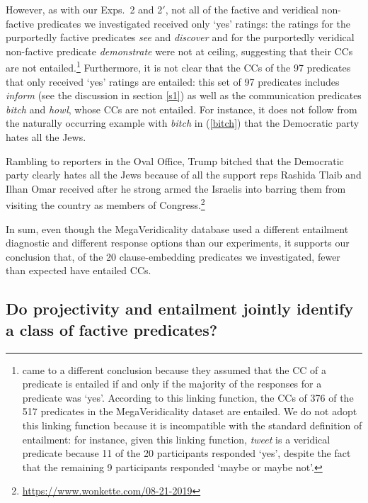 \documentclass[11pt,fleqn]{article}
\newcommand{\6}{\mbox{$[\hspace*{-.6mm}[$}}
\newcommand{\9}{\mbox{$]\hspace*{-.6mm}]$}}
\begin{document}
{However, as with our Exps.~2 and 2$'$, not all of the factive and veridical non-factive predicates we investigated received only `yes' ratings: the ratings for the purportedly factive predicates {\em see} and {\em discover} and for the purportedly veridical non-factive predicate {\em demonstrate} were not at ceiling, suggesting that their CCs are not entailed.\footnote{\label{mv}\citet{white-rawlins-nels2018} came to a different conclusion because they assumed that the CC of a predicate is entailed if and only if the majority of the responses for a predicate was `yes'. According to this linking function, the CCs of 376 of the 517 predicates in the MegaVeridicality dataset are entailed. We do not adopt this linking function because it is incompatible with the standard definition of entailment: for instance, given this linking function, {\em tweet} is a veridical predicate because 11 of the 20 participants responded `yes', despite the fact that the remaining 9 participants responded `maybe or maybe not'.} Furthermore, it is not clear that the CCs of the 97  predicates that only received `yes' ratings are entailed: this set of 97 predicates includes {\em inform} (see the discussion in section \ref{s1}) as well as the communication predicates {\em bitch} and {\em howl}, whose CCs are not entailed. For instance, it does not follow from the naturally occurring example with {\em bitch} in (\ref{bitch}) that the Democratic party hates all the Jews.

\begin{exe}
\ex\label{bitch} Rambling to reporters in the Oval Office, Trump bitched that the Democratic party clearly hates all the Jews because of all the support reps Rashida Tlaib and Ilhan Omar received after he strong armed the Israelis into barring them from visiting the country as members of Congress.\footnote{\url{https://www.wonkette.com/08-21-2019}}
\end{exe}
In sum, even though the MegaVeridicality database used a different entailment diagnostic and different response options than our experiments, it supports our conclusion that, of the 20 clause-embedding predicates we investigated, fewer than expected have entailed CCs. 
 
\subsection{Do projectivity and entailment jointly identify a class of factive predicates?}\label{s34}

}
\end{document}
